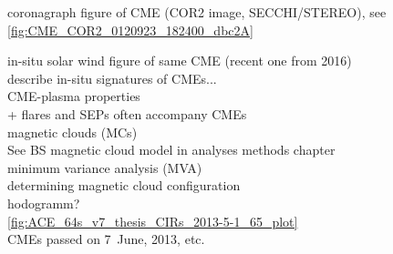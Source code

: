 coronagraph figure of CME (COR2 image, SECCHI/STEREO), see \autoref{fig:CME_COR2_0120923_182400_dbc2A}\\
\begin{figure}[htb]
\end{figure}

in-situ solar wind figure of same CME (recent one from 2016)\\
describe in-situ signatures of CMEs...\\

CME-plasma properties\\
+ flares and SEPs often accompany CMEs\\

magnetic clouds (MCs)\\
See BS magnetic cloud model in analyses methods chapter\\

minimum variance analysis (MVA)\\
determining magnetic cloud configuration \citep{Bothmer1998}\\
hodogramm?\\


\autoref{fig:ACE_64s_v7_thesis_CIRs_2013-5-1_65_plot}\\
CMEs passed on 7~June, 2013, etc.\\


